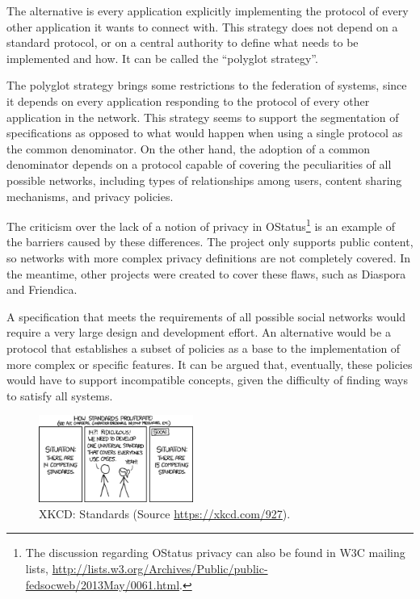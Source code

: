The alternative is every application explicitly implementing the
protocol of every other application it wants to connect with. This
strategy does not depend on a standard protocol, or on a central
authority to define what needs to be implemented and how. It can be
called the ``polyglot strategy''.

The polyglot strategy brings some restrictions to the federation of
systems, since it depends on every application responding to the
protocol of every other application in the network. This strategy seems
to support the segmentation of specifications as opposed to what would
happen when using a single protocol as the common denominator.  On the
other hand, the adoption of a common denominator depends on a protocol
capable of covering the peculiarities of all possible networks, including
types of relationships among users, content sharing mechanisms, and
privacy policies.

The criticism over the lack of a notion of privacy in
OStatus\footnote{The discussion regarding OStatus privacy can also be
found in W3C mailing lists,
\url{http://lists.w3.org/Archives/Public/public-fedsocweb/2013May/0061.html}.}
is an example of the barriers caused by these differences. The project
only supports public content, so networks with more complex privacy
definitions are not completely covered. In the meantime, other projects were
created to cover these flaws, such as Diaspora and Friendica.

A specification that meets the requirements of all possible social
networks would require a very large design and development effort. An
alternative would be a protocol that establishes a subset of policies as
a base to the implementation of more complex or specific features. It
can be argued that, eventually, these policies would have to support
incompatible concepts, given the difficulty of finding ways to satisfy
all systems.

\begin{figure}[!hbt]
  \centering
  \includegraphics[width=0.45\textwidth]{figures/xkcd-standards.eps}
  \caption{XKCD: Standards (Source \url{https://xkcd.com/927}).}
  \label{fig:xkcd_standards}
\end{figure}

